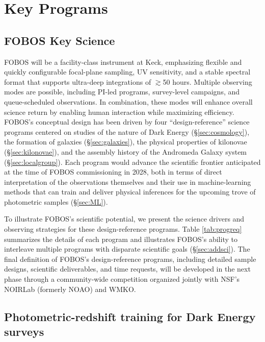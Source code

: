 \documentclass[11pt,a4paper,twoside,onecolumn,openany,final,oldfontcommands]{memoir}
\begin{document}
\newpage

\chapter{Key Programs}

\section{FOBOS Key Science}


FOBOS will be a facility-class instrument at Keck, emphasizing flexible and quickly configurable focal-plane sampling, UV sensitivity, and a stable spectral format that supports ultra-deep integrations of $\gtrsim$50 hours.  Multiple observing modes are possible, including PI-led programs, survey-level campaigns, and queue-scheduled observations.  In combination, these modes will enhance overall science return by enabling human interaction while maximizing efficiency.  FOBOS's conceptual design has been driven by four ``design-reference'' science programs centered on studies of the nature of Dark Energy (\S \ref{sec:cosmology}), the formation of galaxies (\S \ref{sec:galaxies}), the physical properties of kilonovae (\S \ref{sec:kilonovae}), and the assembly history of the Andromeda Galaxy system (\S \ref{sec:localgroup}).  Each program would advance the scientific frontier anticipated at the time of FOBOS commissioning in 2028, both in terms of direct interpretation of the observations themselves and their use in machine-learning methods that can train and deliver physical inferences for the upcoming trove of photometric samples (\S \ref{sec:ML}).

To illustrate FOBOS's scientific potential, we present the science drivers and observing strategies for these design-reference programs.  Table \ref{tab:progreq} summarizes the details of each program and illustrates FOBOS's ability to interleave multiple programs with disparate scientific goals (\S \ref{sec:addsci}).  The final definition of FOBOS's design-reference programs, including detailed sample designs, scientific deliverables, and time requests, will be developed in the next phase through a community-wide competition organized jointly with NSF's NOIRLab (formerly NOAO) and WMKO.

\section{Photometric-redshift training for Dark Energy surveys}
\end{document}
